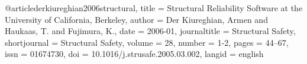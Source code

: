 
@article{derkiureghian2006structural,
  title = {Structural Reliability Software at the {{University}} of {{California}}, {{Berkeley}}},
  author = {Der Kiureghian, Armen and Haukaas, T. and Fujimura, K.},
  date = {2006-01},
  journaltitle = {Structural Safety},
  shortjournal = {Structural Safety},
  volume = {28},
  number = {1-2},
  pages = {44--67},
  issn = {01674730},
  doi = {10.1016/j.strusafe.2005.03.002},
  langid = {english}
}